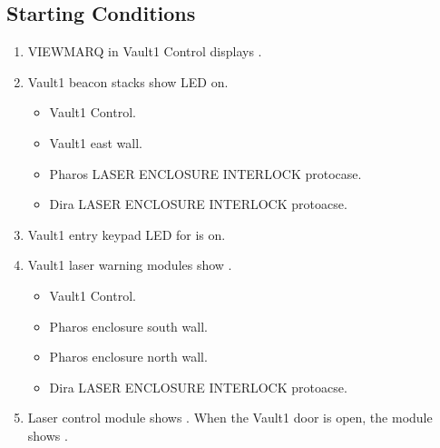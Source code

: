 \documentclass[letterpaper,10pt,english]{sphinxmanual}
\begin{document}
\subsection{Starting Conditions}
\label{\detokenize{testing_documentation/Vault-1_laser:starting-conditions}}\begin{enumerate}
%
\item {} 
\sphinxAtStartPar
VIEWMARQ in Vault\sphinxhyphen{}1 Control displays .

\item {} 
\sphinxAtStartPar
Vault\sphinxhyphen{}1 beacon stacks show  LED on.
\begin{itemize}
\item {} 
\sphinxAtStartPar
Vault\sphinxhyphen{}1 Control.

\item {} 
\sphinxAtStartPar
Vault\sphinxhyphen{}1 east wall.

\item {} 
\sphinxAtStartPar
Pharos LASER ENCLOSURE INTERLOCK protocase.

\item {} 
\sphinxAtStartPar
Dira LASER ENCLOSURE INTERLOCK protoacse.

\end{itemize}

\item {} 
\sphinxAtStartPar
Vault\sphinxhyphen{}1 entry keypad LED for  is on.

\item {} 
\sphinxAtStartPar
Vault\sphinxhyphen{}1 laser warning modules show .
\begin{itemize}
\item {} 
\sphinxAtStartPar
Vault\sphinxhyphen{}1 Control.

\item {} 
\sphinxAtStartPar
Pharos enclosure south wall.

\item {} 
\sphinxAtStartPar
Pharos enclosure north wall.

\item {} 
\sphinxAtStartPar
Dira LASER ENCLOSURE INTERLOCK protoacse.

\end{itemize}

\item {} 
\sphinxAtStartPar
Laser control module shows .
When the Vault\sphinxhyphen{}1 door is open, the module shows .


\end{enumerate}
\end{document}
